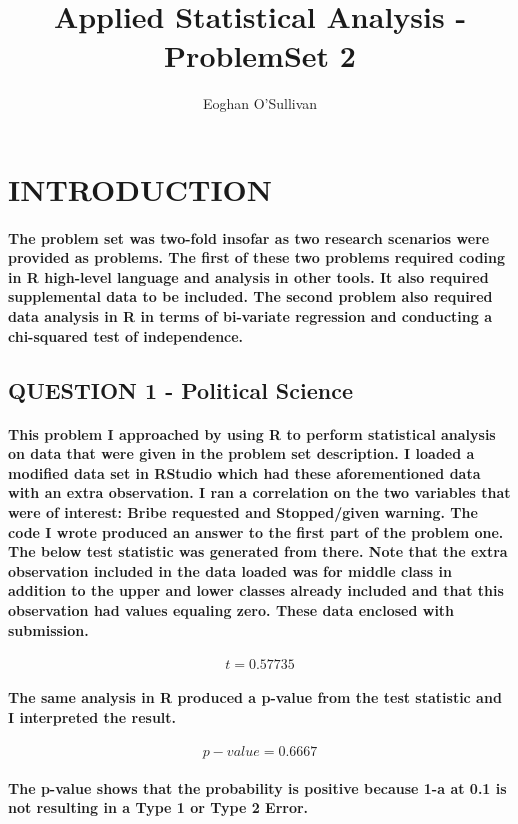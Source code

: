 \documentclass[10pt,a4paper]{article}
\title{Applied Statistical Analysis - ProblemSet 2}
\author{Eoghan O'Sullivan}
\begin{document}
	\maketitle
	\section{INTRODUCTION}
	\paragraph{The problem set was two-fold insofar as two research scenarios were provided as problems. The first of these two problems required coding in R high-level language and analysis in other tools. It also required supplemental data to be included. The second problem also required data analysis in R in terms of bi-variate regression and conducting a chi-squared test of independence.}
	\subsection{QUESTION 1 - Political Science}
	\paragraph{This problem I approached by using R to perform statistical analysis on data that were given in the problem set description. I loaded a modified data set in RStudio which had these aforementioned data with an extra observation. I ran a correlation on the two variables that were of interest: Bribe requested and Stopped/given warning. The code I wrote produced an answer to the first part of the problem one. The below test statistic was generated from there. Note that the extra observation included in the data loaded was for middle class in addition to the upper and lower classes already included and that this observation had values equaling zero. These data enclosed with submission.}
	\begin{equation}
		t = 0.57735
	\end{equation}
	\paragraph{The same analysis in R produced a p-value from the test statistic and I interpreted the result.}	
	\begin{equation}
		p-value = 0.6667
	\end{equation} 
	\paragraph{The p-value shows that the probability is positive because 1-a at 0.1 is not resulting in a Type 1 or Type 2 Error.}
\end{document}
